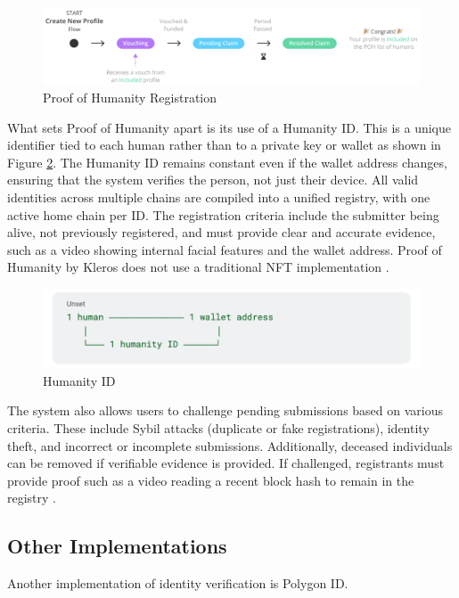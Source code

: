 \documentclass[conference]{IEEEtran}
\begin{document}
\begin{figure}[h!]
    \centering
    \includegraphics[width=0.9\linewidth]{poh-kleros.png}
    \caption{Proof of Humanity Registration}
    \label{fig:poh-kleros}
\end{figure}

What sets Proof of Humanity apart is its use of a Humanity ID. This is a unique identifier tied to each human rather than to a private key or wallet as shown in Figure \ref{fig:poh-humanity-id}. The Humanity ID remains constant even if the wallet address changes, ensuring that the system verifies the person, not just their device. All valid identities across multiple chains are compiled into a unified registry, with one active home chain per ID. The registration criteria include the submitter being alive, not previously registered, and must provide clear and accurate evidence, such as a video showing internal facial features and the wallet address. Proof of Humanity by Kleros does not use a traditional NFT implementation \cite{poh-policy}.

\begin{figure}[h!]
    \centering
    \includegraphics[width=0.9\linewidth]{poh-humanity-id.png}
    \caption{Humanity ID}
    \label{fig:poh-humanity-id}
\end{figure}

The system also allows users to challenge pending submissions based on various criteria. These include Sybil attacks (duplicate or fake registrations), identity theft, and incorrect or incomplete submissions. Additionally, deceased individuals can be removed if verifiable evidence is provided. If challenged, registrants must provide proof such as a video reading a recent block hash to remain in the registry \cite{poh-policy}.

\subsection{Other Implementations}
Another implementation of identity verification is Polygon ID. 
\end{document}

